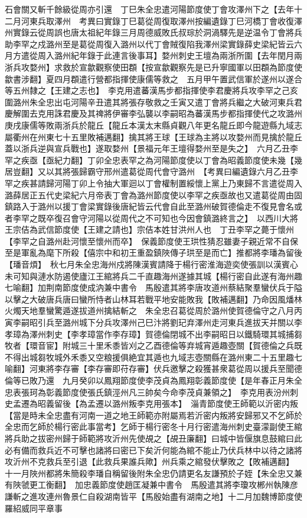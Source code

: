石會關又斬千餘級從周亦引還　丁巳朱全忠遣河陽節度使丁會攻澤州下之【去年十二月河東兵取澤州　考異曰實錄丁巳葛從周復取澤州按編遺錄丁巳河橋丁會收復澤州實錄云從周誤也唐太祖紀年錄三月周德威敗氏叔琮於洞渦驛先是逆温令丁會將兵助李罕之戍潞州至是葛從周復入潞州以代丁會賊復陷我澤州梁實錄薛史梁紀皆云六月方遣從周入潞州紀年錄于此連言後事耳】婺州刺史王壇為兩浙所圍【去年閏月兩浙兵攻婺州】求救於宣歙觀察使田頵【按宣歙觀察先是已升寧國軍以田頵為節度使歙書涉翻】夏四月頵遣行營都指揮使康儒等救之　五月甲午置武信軍於遂州以遂合等五州隸之【王建之志也】　李克用遣蕃漢馬步都指揮使李君慶將兵攻李罕之己亥圍潞州朱全忠出屯河陽辛丑遣其將張存敬救之壬寅又遣丁會將兵繼之大破河東兵君慶解圍去克用誅君慶及其禆將伊審李弘襲以李嗣昭為蕃漢馬步都指揮使代之攻潞州　庚戌康儒等敗兩浙兵於龍丘【龍丘本漢太末縣貞觀八年更名龍丘即今龍遊縣九域志屬衢州在州東七十五里敗補邁翻】擒其將王球【王球為主將以攻婺州而見擒於龍丘蓋以浙兵逆與宣兵戰也】遂取婺州【景福元年王壇得婺州至是失之】　六月乙丑李罕之疾亟【亟紀力翻】丁卯全忠表罕之為河陽節度使以丁會為昭義節度使未幾【幾居豈翻】又以其將張歸霸守邢州遣葛從周代會守潞州　【考異曰編遺錄六月乙丑李罕之疾甚請歸河陽丁卯上令抽大軍迴以丁會權制置綏懷上黨上乃東歸不言遣從周入潞薛居正五代史梁紀六月帝表丁會為潞州節度使以李罕之疾亟故也又遣葛從周由固鎮路入于潞州以援丁會梁實錄後唐紀皆云代會自此至潞州破賀德倫走不復見會名或者李罕之既卒復召會守河陽以從周代之不可知也今因會鎮潞終言之】　以西川大將王宗佶為武信節度使【王建之請也】宗佶本姓甘洪州人也　丁丑李罕之薨于懷州【李罕之自潞州赴河懷至懷州而卒】　保義節度使王珙性猜忍雖妻子親近常不自保至是軍亂為麾下所殺【僖宗中和初王重盈鎮陜傳子珙至是而亡】推都將李璠為留後【璠音煩】　秋七月朱全忠海州戍將陳漢賓請降于楊行密淮海遊奕使張訓以漢賓心未可知與漣水防遏使廬江王綰將兵二千直趣海州遂據其城【楊行密自此遂有海州趣七喻翻】加荆南節度使成汭兼中書令　馬殷遣其將李唐攻道州蔡結聚羣蠻伏兵于隘以擊之大破唐兵唐曰蠻所恃者山林耳若戰平地安能敗我【敗補邁翻】乃命因風燔林火燭天地羣蠻驚遁遂拔道州擒結斬之　朱全忠召葛從周於潞州使賀德倫守之八月丙寅李嗣昭引兵至潞州城下分兵攻澤州己巳汴將劉玘弃澤州走河東兵進拔天并關以李孝璋為澤州刺史【李孝璋當作李存璋】賀德倫閉城不出李嗣昭日以鐵騎環其城捕芻牧者【環音宦】附城三十里禾黍皆刈之乙酉德倫等弃城宵遁趣壺關【賀德倫之兵既不得出城芻牧城外禾黍又空粮援俱絶宜其遁也九域志壺關縣在潞州東二十五里趣七喻翻】河東將李存審【李存審即苻存審】伏兵邀擊之殺獲甚衆葛從周以援兵至聞德倫等已敗乃還　九月癸卯以鳳翔節度使李茂貞為鳳翔彰義節度使【是年春正月朱全忠表張珂為彰義節度使張氏鎮涇州凡三帥矣今命李茂貞兼領之】　李克用表汾州刺史孟遷為昭義留後【為孟遷以潞州叛李克用張本】　淄青節度使王師範以沂密内叛【當是時未全忠盡有河南一道之地王師範亦附屬焉若沂密内叛將安歸邪又不乞師於全忠而乞師於楊行密此事當考】乞師于楊行密冬十月行密遣海州刺史臺濛副使王綰將兵助之拔密州歸于師範將攻沂州先使覘之【覘丑廉翻】曰城中皆偃旗息鼓綰曰此必有備而救兵近不可擊也諸將曰密已下矣沂何能為綰不能止乃伏兵林中以待之諸將攻沂州不克救兵至引退【此救兵果誰兵歟】州兵乘之綰發伏擊敗之【敗補邁翻】　十一月陜州都將朱簡殺李璠自稱留後附朱全忠仍請更名友謙預於子姪【朱全忠又兼有陜虢更工衡翻】　加忠義節度使趙匡凝兼中書令　馬殷遣其將李瓊攻郴州執陳彦謙斬之進攻連州魯景仁自殺湖南皆平【馬殷始盡有湖南之地】十二月加魏博節度使羅紹威同平章事

